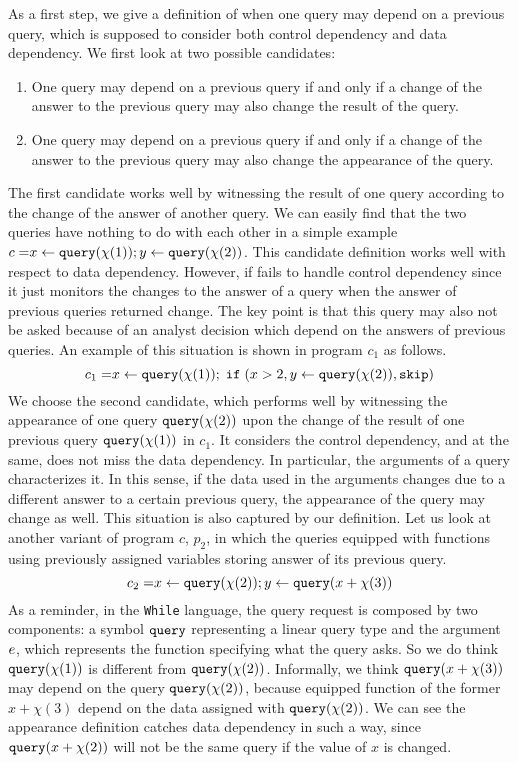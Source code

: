 \documentclass[a4paper,11pt]{article}
\begin{document}
{
As a first step, we give a definition of when one query may depend on a previous query, which is supposed to consider both control dependency and data dependency. We first look at two possible candidates:
\begin{enumerate}
    \item One query may depend on a previous query if and only if a change of the answer to the previous query may also change the result of the query.
    \item One query may depend on a previous query if and only if a change of the answer to the previous query may also change the appearance of the query.
\end{enumerate}
}

{
   The first candidate works well by witnessing the result of one query according to the change of the answer of another query. We can easily find that the two queries have nothing to do with each other in a simple example   
%
    $ c = \mathrel{ x \leftarrow {\tt query}(\chi(1)) } ; \mathrel{ y \leftarrow {\tt query}(\chi(2)) }$. This candidate definition works well with respect to data dependency. 
    However, if fails to handle control dependency since it just monitors the changes to the answer of a query when the answer of previous queries returned change. 
    The key point is that this query may also not be asked because of an analyst decision which depend on the answers of previous queries. 
    An example of this situation is shown in program $c_1$ as follows.
    \[
      c_1 = \mathrel{ x \leftarrow {\tt query}(\chi(1)) } ; \;\mathtt{if}\;( x > 2 ,\mathrel{ y \leftarrow {\tt query}(\chi(2)) }, \mathtt{skip} )
   	\]
   	We choose the second candidate, which performs well by witnessing the appearance of one query ${\tt query}(\chi(2))$ upon the change of the result of one previous query ${\tt query}(\chi(1))$ in $c_1$. 
   	It considers the control dependency, and at the same, does not miss the data dependency.
   	In particular, the arguments of a query characterizes it.
   	In this sense, if the data used in the arguments changes due to a different answer to a certain previous query, the appearance of the query may change as well.
   	This situation is also captured by our definition. 
   	Let us look at another variant of program $c$, $p_2$, in which the queries equipped with functions using previously assigned variables storing answer of its previous query.
    \[
      c_2 = \mathrel{ x \leftarrow {\tt query}(\chi(2)) } ; \mathrel{ y \leftarrow {\tt query}(x+\chi(3)) }
   	\]
    As a reminder, in the {\tt While} language, the query request is composed by two components: a symbol ${\tt query}$ representing a linear query type and the argument $e$, which represents the function specifying what the query asks. 
    So we do think ${\tt query}(\chi(1))$ is different from ${\tt query}(\chi(2))$.
    Informally, we think ${\tt query}(x+\chi(3))$ may depend on the query ${\tt query}(\chi(2))$, because equipped function of the former $x+\chi(3)$ depend on the data assigned with ${\tt query}(\chi(2))$.
    We can see the appearance definition catches data dependency in such a way, 
    since ${\tt query}(x+\chi(2))$ will not be the same query if the value of $x$ is changed.    
}
\end{document}
